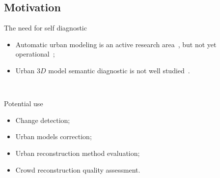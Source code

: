 \documentclass{beamer}
\begin{document}
        \subsection{Motivation}
            \begin{frame}{The need for self diagnostic}
                \begin{itemize}[label=$\blacktriangleright$, font=\color{IGNGreen}]
                    \item<1-> Automatic urban modeling is an active research area~\cite{Musialski2012}, but not \textcolor{IGNRed}{yet operational}~\cite{rottensteiner2014results};
                    \item<2-> Urban $3D$ model semantic diagnostic is not well studied~\cite{nguatem2017modeling}.
                \end{itemize}
~\\
            \end{frame}

            \begin{frame}{Potential use}
                \begin{itemize}[label=$\blacktriangleright$, font=\color{IGNGreen}]
                    \item<1-> Change detection;
                    \item<2-> Urban models correction;
                    \item<3-> Urban reconstruction method evaluation;
                    \item<4-> Crowd reconstruction quality assessment.
                \end{itemize}
            \end{frame}
\end{document}
